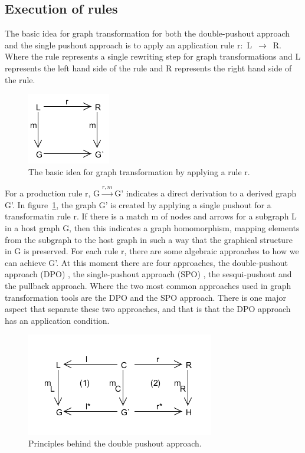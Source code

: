 \documentclass[pdftex,11pt,a4paper]{article}
\begin{document}
\subsection{Execution of rules}
\noindent The basic idea for graph transformation for both the double-pushout
approach and the single pushout approach is to apply an application rule
\mbox{r: L $\longrightarrow$ R}. Where the rule represents a single rewriting
step for graph transformations and L represents the left hand side of the rule and R
represents the right hand side of the rule.

\begin{figure}[H]
	\centering
	\includegraphics[scale=0.7]{figures/GraphTransformationGeneral.png}
	\caption{The basic idea for graph transformation by applying a rule r.}
	\label{fig:GraphTransformationGeneral}
\end{figure}

For a production rule r, \mbox{G$\xrightarrow{r,m}$G'} indicates a direct
derivation to a derived graph G'. In
figure~\ref{fig:GraphTransformationGeneral}, the graph G' is created by
applying a single pushout for a transformatin rule r. If there is a match m of
nodes and arrows for a subgraph L in a host graph G, then this indicates a
graph homomorphism, mapping elements from the subgraph to the host graph in
such a way that the graphical structure in G is preserved. For each rule r,
there are some algebraic approaches to how we can achieve G'. At this moment
there are four approaches, the double-pushout approach (DPO) \cite{Loewe1997}, the
single-pushout approach (SPO) \cite{Ehrig1997}, the sesqui-pushout\cite{Corradini2006} and
the pullback approach\cite{Bauderon}. Where the two most common approaches used in
graph transformation tools are the DPO and the SPO approach. There is one major
aspect that separate these two approaches, and that is that the DPO approach
has an application condition.

\begin{figure}[H]
	\centering
	\includegraphics[scale=0.7]{figures/DPO.png}
	\caption{Principles behind the double pushout approach.}
	\label{fig:DPO}
\end{figure}
\end{document}
